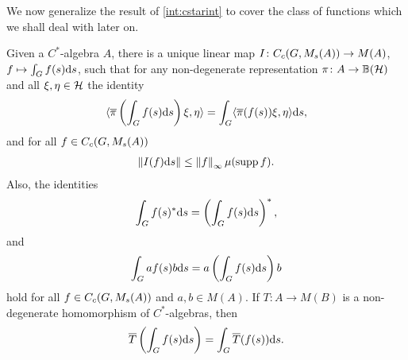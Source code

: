 We now generalize the result of \cref{int:cstarint} to cover the class of functions which we shall deal with later on.
\begin{theorem}
Given a $C^*$-algebra $A$, there is a unique linear map $I\colon C_c(G,M_s(A)) \to M(A)$, $f \mapsto \int_G f(s) \mathrm{d} s$, such that for any non-degenerate representation $\pi \colon A \to \mathbb{B}(\mathcal{H})$ and all $\xi, \eta \in \mathcal{H}$ the identity
\begin{align}
	\langle \overline \pi \left( \int_G f(s) \mathrm{d} s \right) \xi , \eta \rangle = \int_{G} \langle \overline \pi(f(s)) \xi , \eta \rangle \mathrm{d} s,
	\label{mult:1.35}
\end{align}
and for all $f \in C_c(G,M_s(A))$
\begin{align}
	\left\lVert I(f) \mathrm{d} s \right\rVert \leq \left\lVert f \right\rVert _{ \infty} \mu(\operatorname{supp} f ).
\end{align}
Also, the identities
\begin{align}
	\int_G f(s) ^* \mathrm{d} s = \left( \int_G f(s) \mathrm{d} s \right)^*,
\end{align}
and
\begin{align}
	\int_G a f(s) b \mathrm{d} s = a \left( \int_G f(s) \mathrm{d} s  \right) b
\end{align}
hold for all $f \in C_c(G,M_s(A))$ and $a,b \in M(A)$. If $T \colon A \to M(B)$ is a non-degenerate homomorphism of $C^*$-algebras, then
\begin{align}
	\overline T \left( \int_G f(s) \mathrm{d} s\right) = \int_G \overline T (f(s)) \mathrm{d} s.
\end{align}

\label{int:multstrictintegral}
\end{theorem}
